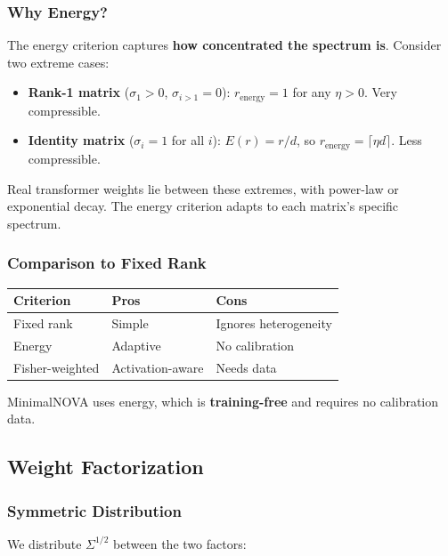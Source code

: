 \subsubsection{Why Energy?}

The energy criterion captures \textbf{how concentrated the spectrum is}. 
Consider two extreme cases:

\begin{itemize}
\item \textbf{Rank-1 matrix} ($\sigma_1 > 0$, $\sigma_{i>1} = 0$): $r_\text{energy} = 1$
  for any $\eta > 0$. Very compressible.
\item \textbf{Identity matrix} ($\sigma_i = 1$ for all $i$): $E(r) = r/d$, so
  $r_\text{energy} = \lceil \eta d \rceil$. Less compressible.

\end{itemize}
Real transformer weights lie between these extremes, with power-law or 
exponential decay. The energy criterion adapts to each matrix's specific 
spectrum.

\subsubsection{Comparison to Fixed Rank}

\begin{table}[H]
\centering
\small
\begin{tabular}{lll}
\toprule
\textbf{Criterion} & \textbf{Pros} & \textbf{Cons} \\
\midrule
Fixed rank & Simple & Ignores heterogeneity \\
Energy & Adaptive & No calibration \\
Fisher-weighted & Activation-aware & Needs data \\
\bottomrule
\end{tabular}
\end{table}

MinimalNOVA uses energy, which is \textbf{training-free} and requires no 
calibration data.

\subsection{Weight Factorization}

\subsubsection{Symmetric Distribution}

We distribute $\Sigma^{1/2}$ between the two factors:

